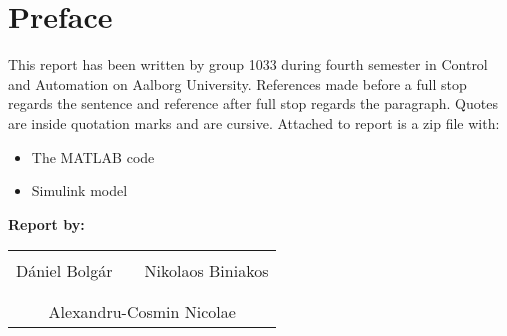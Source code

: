 \chapter*{Preface}
This report has been written by group 1033 during fourth semester in Control and Automation on Aalborg University.
References made before a full stop regards the sentence and reference after full stop regards the paragraph. Quotes are inside quotation marks and are cursive.
Attached to report is a zip file with:
\begin{itemize}
	\item The MATLAB code 
	\item Simulink model
\end{itemize}
\vspace{2cm}

\textbf{Report by:}\\
\vspace{-5pt}
\begin{table}[H]
	\centering
	\begin{tabular}{c c c}
		\underline{\phantom{JAERJAERJAERJAERGO}} & \phantom{cookies} & \underline{\phantom{JAERJAERJAERJAERGO}} \\
		 	Dániel Bolgár	& \phantom{cookies} &  Nikolaos Biniakos	\\
		&&\\
		\multicolumn{3}{c}{\underline{\phantom{JAERJAERJAERJAERGO}}}\\
		\multicolumn{3}{c}{Alexandru-Cosmin Nicolae}\\				
						
	\end{tabular}
\end{table}


\pagebreak

